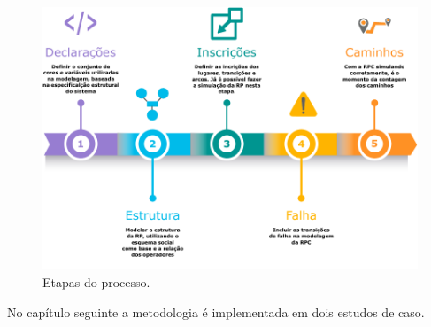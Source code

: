 \begin{figure}[ht]
\centering
\includegraphics[scale=0.9]{imagens/4-fluxograma.pdf}
\caption{Etapas do processo.}
\label{fig:4-fluxograma}
\end{figure}

No capítulo seguinte a metodologia é implementada em dois estudos de caso. 